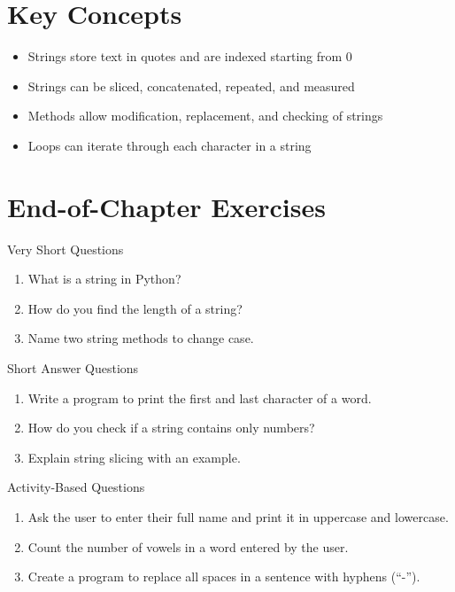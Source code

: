 \section{Key Concepts}

\begin{itemize}
    \item Strings store text in quotes and are indexed starting from 0  
    \item Strings can be sliced, concatenated, repeated, and measured  
    \item Methods allow modification, replacement, and checking of strings  
    \item Loops can iterate through each character in a string  
\end{itemize}

\section{End-of-Chapter Exercises}

\begin{exercise}{Very Short Questions}
\begin{enumerate}
    \item What is a string in Python?  
    \item How do you find the length of a string?  
    \item Name two string methods to change case.  
\end{enumerate}
\end{exercise}

\begin{exercise}{Short Answer Questions}
\begin{enumerate}
    \item Write a program to print the first and last character of a word.  
    \item How do you check if a string contains only numbers?  
    \item Explain string slicing with an example.  
\end{enumerate}
\end{exercise}

\begin{exercise}{Activity-Based Questions}
\begin{enumerate}
    \item Ask the user to enter their full name and print it in uppercase and lowercase.  
    \item Count the number of vowels in a word entered by the user.  
    \item Create a program to replace all spaces in a sentence with hyphens (``-'').  
\end{enumerate}
\end{exercise}

